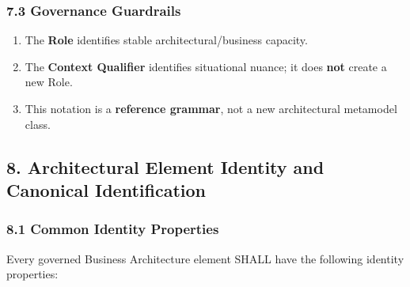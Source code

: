 \label{rad:metamodel:312}
\subsubsection*{7.3 Governance Guardrails}
\label{rad:metamodel:313}

\begin{enumerate}

\item 
The \textbf{Role} identifies stable architectural/\allowbreak{}business capacity.



\item 
The \textbf{Context Qualifier} identifies situational nuance; it does \textbf{not} create a new Role.



\item 
This notation is a \textbf{reference grammar}, not a new architectural metamodel class.



\end{enumerate}
\label{rad:metamodel:317}

\par\smallskip
{}\label{rad:metamodel:319}
\subsection*{8. Architectural Element Identity and Canonical Identification}
\label{rad:metamodel:321}
\subsubsection*{8.1 Common Identity Properties}
\label{rad:metamodel:323}

Every governed Business Architecture element SHALL have the following identity properties:

